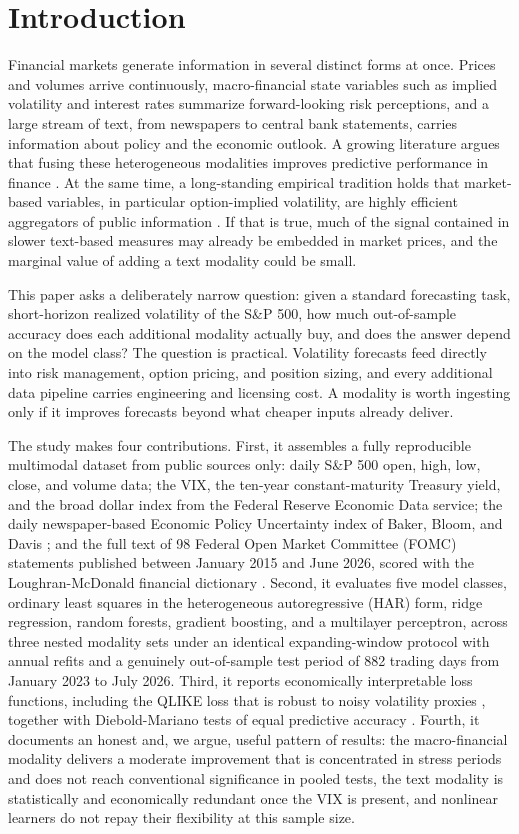 \documentclass[10pt,twocolumn]{article}
\begin{document}
\section{Introduction}
Financial markets generate information in several distinct forms at once. Prices and volumes arrive continuously, macro-financial state variables such as implied volatility and interest rates summarize forward-looking risk perceptions, and a large stream of text, from newspapers to central bank statements, carries information about policy and the economic outlook. A growing literature argues that fusing these heterogeneous modalities improves predictive performance in finance \cite{sardelich2018,araci2019}. At the same time, a long-standing empirical tradition holds that market-based variables, in particular option-implied volatility, are highly efficient aggregators of public information \cite{whaley2000}. If that is true, much of the signal contained in slower text-based measures may already be embedded in market prices, and the marginal value of adding a text modality could be small.

This paper asks a deliberately narrow question: given a standard forecasting task, short-horizon realized volatility of the S\&P 500, how much out-of-sample accuracy does each additional modality actually buy, and does the answer depend on the model class? The question is practical. Volatility forecasts feed directly into risk management, option pricing, and position sizing, and every additional data pipeline carries engineering and licensing cost. A modality is worth ingesting only if it improves forecasts beyond what cheaper inputs already deliver.

The study makes four contributions. First, it assembles a fully reproducible multimodal dataset from public sources only: daily S\&P 500 open, high, low, close, and volume data; the VIX, the ten-year constant-maturity Treasury yield, and the broad dollar index from the Federal Reserve Economic Data service; the daily newspaper-based Economic Policy Uncertainty index of Baker, Bloom, and Davis \cite{baker2016}; and the full text of 98 Federal Open Market Committee (FOMC) statements published between January 2015 and June 2026, scored with the Loughran-McDonald financial dictionary \cite{loughran2011}. Second, it evaluates five model classes, ordinary least squares in the heterogeneous autoregressive (HAR) form, ridge regression, random forests, gradient boosting, and a multilayer perceptron, across three nested modality sets under an identical expanding-window protocol with annual refits and a genuinely out-of-sample test period of 882 trading days from January 2023 to July 2026. Third, it reports economically interpretable loss functions, including the QLIKE loss that is robust to noisy volatility proxies \cite{patton2011}, together with Diebold-Mariano tests of equal predictive accuracy \cite{diebold1995}. Fourth, it documents an honest and, we argue, useful pattern of results: the macro-financial modality delivers a moderate improvement that is concentrated in stress periods and does not reach conventional significance in pooled tests, the text modality is statistically and economically redundant once the VIX is present, and nonlinear learners do not repay their flexibility at this sample size.
\end{document}
